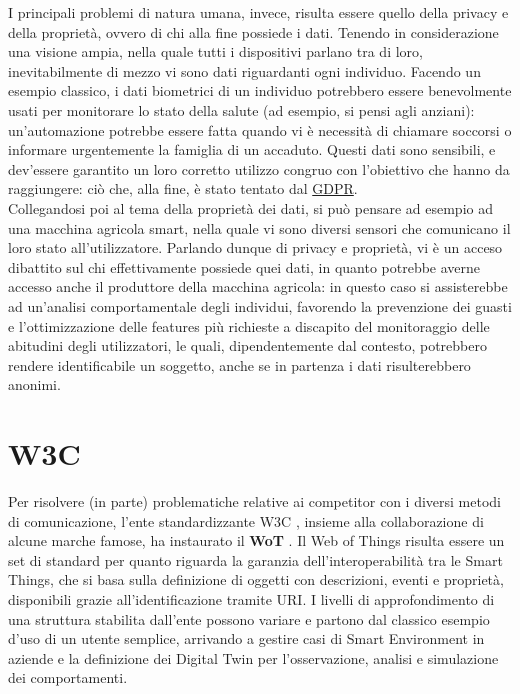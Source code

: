 \documentclass[12pt,a4paper,openright,oneside]{report}
\begin{document}
I principali problemi di natura umana, invece, risulta essere quello della privacy e della proprietà, ovvero di chi alla fine possiede i dati. Tenendo in considerazione una visione ampia, nella quale tutti i dispositivi parlano tra di loro, inevitabilmente di mezzo vi sono dati riguardanti ogni individuo. Facendo un esempio classico, i dati biometrici di un individuo potrebbero essere benevolmente usati per monitorare lo stato della salute (ad esempio, si pensi agli anziani): un'automazione potrebbe essere fatta quando vi è necessità di chiamare soccorsi o informare urgentemente la famiglia di un accaduto. Questi dati sono sensibili, e dev'essere garantito un loro corretto utilizzo congruo con l'obiettivo che hanno da raggiungere: ciò che, alla fine, è stato tentato dal \href{https://eur-lex.europa.eu/legal-content/IT/TXT/?uri=uriserv:OJ.L_.2016.119.01.0001.01.ITA&toc=OJ:L:2016:119:TOC}{GDPR}.\\

Collegandosi poi al tema della proprietà dei dati, si può pensare ad esempio ad una macchina agricola smart, nella quale vi sono diversi sensori che comunicano il loro stato all'utilizzatore. Parlando dunque di privacy e proprietà, vi è un acceso dibattito sul chi effettivamente possiede quei dati, in quanto potrebbe averne accesso anche il produttore della macchina agricola: in questo caso si assisterebbe ad un'analisi comportamentale degli individui, favorendo la prevenzione dei guasti e l'ottimizzazione delle features più richieste a discapito del monitoraggio delle abitudini degli utilizzatori, le quali, dipendentemente dal contesto, potrebbero rendere identificabile un soggetto, anche se in partenza i dati risulterebbero anonimi.\\

\section{W3C}
\label{sec:w3c}
Per risolvere (in parte) problematiche relative ai competitor con i diversi metodi di comunicazione, l'ente standardizzante W3C \cite{w3c}, insieme alla collaborazione di alcune marche famose, ha instaurato il \textbf{WoT} \cite{wot}. Il Web of Things risulta essere un set di standard per quanto riguarda la garanzia dell'interoperabilità tra le Smart Things, che si basa sulla definizione di oggetti con descrizioni, eventi e proprietà, disponibili grazie all'identificazione tramite URI. I livelli di approfondimento di una struttura stabilita dall'ente possono variare e partono dal classico esempio d'uso di un utente semplice, arrivando a gestire casi di Smart Environment in aziende e la definizione dei Digital Twin per l'osservazione, analisi e simulazione dei comportamenti.\\
\end{document}
